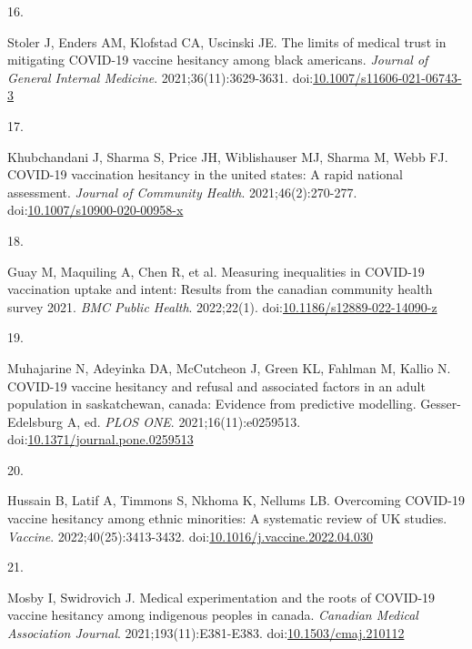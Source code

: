 \documentclass[
  letterpaper,
  DIV=11,
  numbers=noendperiod]{scrartcl}
\newlength{\cslhangindent}
\newlength{\csllabelwidth}
\newlength{\cslentryspacingunit} %
\newenvironment{CSLReferences}[2] %
 {%
  \setlength{\parindent}{0pt}
  \ifodd #1
  \let\oldpar\par
  \def\par{\hangindent=\cslhangindent\oldpar}
  \fi
  \setlength{\parskip}{#2\cslentryspacingunit}
 }%
 {}
\newcommand{\CSLLeftMargin}[1]{\parbox[t]{\csllabelwidth}{#1}}
\newcommand{\CSLRightInline}[1]{\parbox[t]{\linewidth - \csllabelwidth}{#1}\break}
\begin{document}
\begin{CSLReferences}{0}{0}
\leavevmode{}%
\CSLLeftMargin{16. }%
\CSLRightInline{Stoler J, Enders AM, Klofstad CA, Uscinski JE. The
limits of medical trust in mitigating {COVID}-19 vaccine hesitancy among
black americans. \emph{Journal of General Internal Medicine}.
2021;36(11):3629-3631.
doi:\href{https://doi.org/10.1007/s11606-021-06743-3}{10.1007/s11606-021-06743-3}}

\leavevmode{}%
\CSLLeftMargin{17. }%
\CSLRightInline{Khubchandani J, Sharma S, Price JH, Wiblishauser MJ,
Sharma M, Webb FJ. {COVID}-19 vaccination hesitancy in the united
states: A rapid national assessment. \emph{Journal of Community Health}.
2021;46(2):270-277.
doi:\href{https://doi.org/10.1007/s10900-020-00958-x}{10.1007/s10900-020-00958-x}}

\leavevmode{}%
\CSLLeftMargin{18. }%
\CSLRightInline{Guay M, Maquiling A, Chen R, et al. Measuring
inequalities in {COVID}-19 vaccination uptake and intent: Results from
the canadian community health survey 2021. \emph{{BMC} Public Health}.
2022;22(1).
doi:\href{https://doi.org/10.1186/s12889-022-14090-z}{10.1186/s12889-022-14090-z}}

\leavevmode{}%
\CSLLeftMargin{19. }%
\CSLRightInline{Muhajarine N, Adeyinka DA, McCutcheon J, Green KL,
Fahlman M, Kallio N. {COVID}-19 vaccine hesitancy and refusal and
associated factors in an adult population in saskatchewan, canada:
Evidence from predictive modelling. Gesser-Edelsburg A, ed. \emph{{PLOS}
{ONE}}. 2021;16(11):e0259513.
doi:\href{https://doi.org/10.1371/journal.pone.0259513}{10.1371/journal.pone.0259513}}

\leavevmode{}%
\CSLLeftMargin{20. }%
\CSLRightInline{Hussain B, Latif A, Timmons S, Nkhoma K, Nellums LB.
Overcoming {COVID}-19 vaccine hesitancy among ethnic minorities: A
systematic review of {UK} studies. \emph{Vaccine}.
2022;40(25):3413-3432.
doi:\href{https://doi.org/10.1016/j.vaccine.2022.04.030}{10.1016/j.vaccine.2022.04.030}}

\leavevmode{}%
\CSLLeftMargin{21. }%
\CSLRightInline{Mosby I, Swidrovich J. Medical experimentation and the
roots of {COVID}-19 vaccine hesitancy among indigenous peoples in
canada. \emph{Canadian Medical Association Journal}.
2021;193(11):E381-E383.
doi:\href{https://doi.org/10.1503/cmaj.210112}{10.1503/cmaj.210112}}


\end{CSLReferences}
\end{document}
